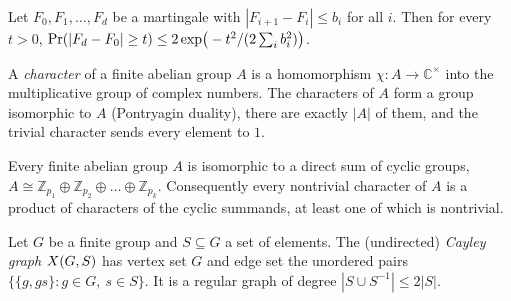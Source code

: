 \begin{lemma}
  \label{lem:azuma}
  \mathlibok
  Let $F_0, F_1, \dots, F_d$ be a martingale with $|F_{i+1} - F_i| \le b_i$ for
  all $i$. Then for every $t > 0$,
  $\operatorname{Pr}\!\left(|F_d - F_0| \ge t\right) \le 2\exp\!\big(-t^2 / (2\sum_i b_i^2)\big)$.
\end{lemma}

\begin{definition}
  \label{def:character}
  \mathlibok
  A \emph{character} of a finite abelian group $A$ is a homomorphism
  $\chi : A \to \mathbb{C}^{\times}$ into the multiplicative group of complex
  numbers. The characters of $A$ form a group isomorphic to $A$ (Pontryagin
  duality), there are exactly $|A|$ of them, and the trivial character sends
  every element to $1$.
\end{definition}

\begin{definition}
  \label{def:abelian-structure}
  \mathlibok
  Every finite abelian group $A$ is isomorphic to a direct sum of cyclic groups,
  $A \cong \mathbb{Z}_{p_1} \oplus \mathbb{Z}_{p_2} \oplus \dots \oplus
  \mathbb{Z}_{p_k}$. Consequently every nontrivial character of $A$ is a product
  of characters of the cyclic summands, at least one of which is nontrivial.
\end{definition}


\begin{definition}
  \label{def:cayley-graph}
  Let $G$ be a finite group and $S \subseteq G$ a set of elements. The
  (undirected) \emph{Cayley graph} $X(G,S)$ has vertex set $G$ and edge set
  the unordered pairs $\{\{g, gs\} : g \in G,\ s \in S\}$. It is a regular graph
  of degree $|S \cup S^{-1}| \le 2|S|$.
\end{definition}

